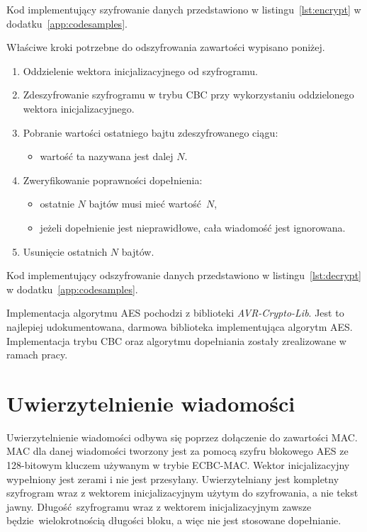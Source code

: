 Kod implementujący szyfrowanie danych przedstawiono w listingu~\ref{lst:encrypt} w dodatku~\ref{app:codesamples}.

Właściwe kroki potrzebne do odszyfrowania zawartości wypisano poniżej.

\begin{enumerate}
\item Oddzielenie wektora inicjalizacyjnego od szyfrogramu.
\item Zdeszyfrowanie szyfrogramu w trybu CBC przy wykorzystaniu oddzielonego wektora inicjalizacyjnego.
\item Pobranie wartości ostatniego bajtu zdeszyfrowanego ciągu:
\begin{itemize}
    \item wartość ta nazywana jest dalej $ N $.
\end{itemize}
\item Zweryfikowanie poprawności dopełnienia:
\begin{itemize}
    \item ostatnie $ N $ bajtów musi mieć wartość $ N $,
    \item jeżeli dopełnienie jest nieprawidłowe, cała wiadomość jest ignorowana.
\end{itemize}
\item Usunięcie ostatnich $ N $ bajtów.
\end{enumerate}

Kod implementujący odszyfrowanie danych przedstawiono w listingu~\ref{lst:decrypt} w dodatku~\ref{app:codesamples}.

Implementacja algorytmu AES pochodzi z biblioteki \emph{AVR-Crypto-Lib}. Jest to najlepiej udokumentowana, darmowa biblioteka implementująca algorytm AES. Implementacja trybu CBC oraz algorytmu dopełniania zostały zrealizowane w ramach pracy.

\section{Uwierzytelnienie wiadomości}
\label{sec:auth}

Uwierzytelnienie wiadomości odbywa się poprzez dołączenie do zawartości MAC. MAC dla danej wiadomości tworzony jest za pomocą szyfru blokowego AES ze 128-bitowym kluczem używanym w trybie ECBC-MAC. Wektor inicjalizacyjny wypełniony jest zerami i nie jest przesyłany. Uwierzytelniany jest kompletny szyfrogram wraz z wektorem inicjalizacyjnym użytym do szyfrowania, a nie tekst jawny. Długość szyfrogramu wraz z wektorem inicjalizacyjnym zawsze będzie wielokrotnością długości bloku, a więc nie jest stosowane dopełnianie.

